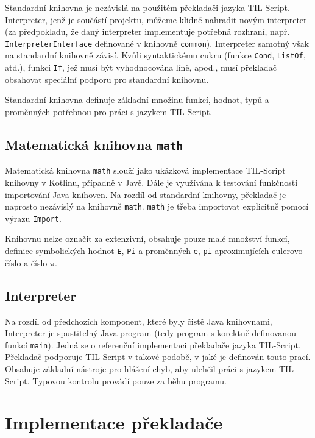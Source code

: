 Standardní knihovna je nezávislá na použitém překladači jazyka TIL-Script. Interpreter, jenž je
součástí projektu, můžeme klidně nahradit novým interpreter (za předpokladu, že daný interpreter
implementuje potřebná rozhraní, např. \lstinline{InterpreterInterface} definované v knihovně
\lstinline{common}). Interpreter samotný však na standardní knihovně závisí. Kvůli syntaktickému
cukru (funkce \lstinline{Cond}, \lstinline{ListOf}, atd.), funkci \lstinline{If}, jež musí být
vyhodnocována líně, apod., musí překladač obsahovat speciální podporu pro standardní knihovnu.

Standardní knihovna definuje základní množinu funkcí, hodnot, typů a proměnných potřebnou pro práci
s jazykem TIL-Script.

\subsection{Matematická knihovna \lstinline{math}}

Matematická knihovna \lstinline{math} slouží jako ukázková implementace TIL-Script knihovny
v Kotlinu, případně v Javě. Dále je využívána k testování funkčnosti importování Java knihoven.
Na rozdíl od standardní knihovny, překladač je naprosto nezávislý na knihovně \lstinline{math}.
\lstinline{math} je třeba importovat explicitně pomocí výrazu \lstinline{Import}.

Knihovnu nelze označit za extenzivní, obsahuje pouze malé množství funkcí, definice symbolických
hodnot \lstinline{E}, \lstinline{Pi} a proměnných \lstinline{e}, \lstinline{pi} aproximujících
eulerovo číslo a číslo $\pi$.

\subsection{Interpreter}

Na rozdíl od předchozích komponent, které byly čistě Java knihovnami, Interpreter je spustitelný
Java program (tedy program s korektně definovanou funkcí \lstinline{main}). Jedná se o referenční
implementaci překladače jazyka TIL-Script. Překladač podporuje TIL-Script v takové podobě, v jaké je
definován touto prací. Obsahuje základní nástroje pro hlášení chyb, aby ulehčil práci
s jazykem TIL-Script. Typovou kontrolu provádí pouze za běhu programu.

\section{Implementace překladače}

